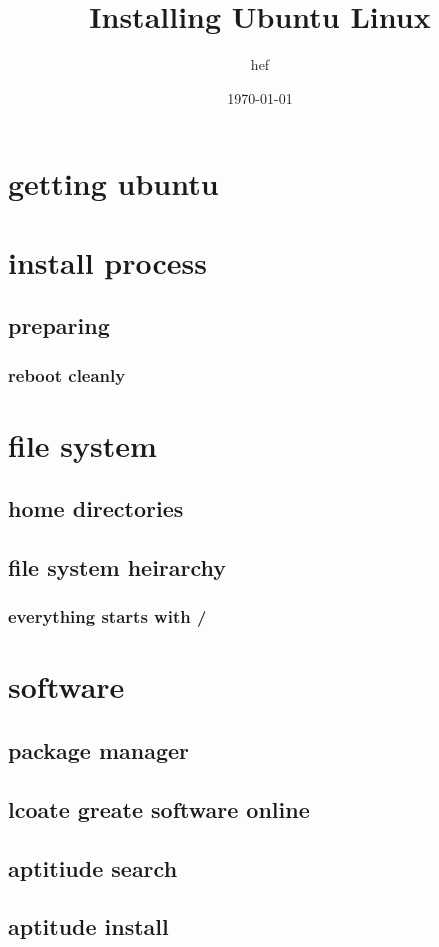 \documentclass[hyperref={pdfpagelabels=false}]{beamer}
\title{Installing Ubuntu Linux}
\author{hef}
\date{\today}
\begin{document}
\frame{\titlepage}
\section[outline]{}
\frame{\tableofcontents}
\section{getting ubuntu}
\section{install process}
\subsection{preparing}
\frame
{
    \frametitle{reboot cleanly}
}
\section{file system}
\subsection{home directories}
\subsection{file system heirarchy}
\frame
{
    \frametitle{everything starts with /}
    
}

\section{software}
\subsection{package manager}
\subsection{lcoate greate software online}
\subsection{aptitiude search}
\subsection{aptitude install}
\end{document}
